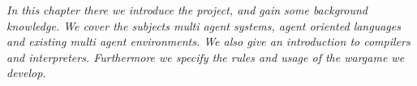 \textit{In this chapter there we introduce the project, and gain some background knowledge. We cover the subjects multi agent systems, agent oriented languages and existing multi agent environments. We also give an introduction to compilers and interpreters. Furthermore we specify the rules and usage of the wargame we develop.}